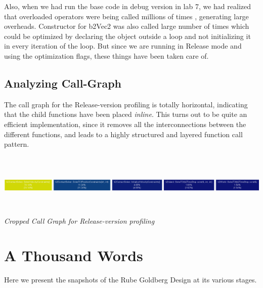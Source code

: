 \documentclass[a4paper,11pt]{article}
\begin{document}
Also, when we had run the base code in debug version in lab 7, we had realized that overloaded operators were being called millions of times , generating large overheads. Constructor for b2Vec2 was also called large number of times which could be optimized by declaring the object outside a loop and not initializing it in every iteration of the loop. But since we are running in Release mode and using the optimization flags, these things have been taken care of. 

\subsection{Analyzing Call-Graph}

The call graph for the Release-version profiling is totally horizontal, indicating that the child functions have been placed \emph{inline}.  This turns out to be quite an efficient implementation, since it removes all the interconnections between the different functions, and leads to a highly structured and layered function call pattern.

\begin{center}
\includegraphics[width=195mm, height=30mm]{call_graph.eps}\\
\emph{Cropped Call Graph for Release-version profiling}
\end{center}


\section{A Thousand Words}

Here we present the snapshots of the Rube Goldberg Design at its various stages.
\end{document}
